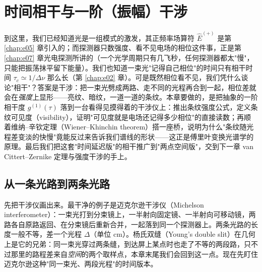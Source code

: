 \chapter{时间相干与一阶（振幅）干涉}
\label{chap:e09}

\begin{chapteropening}
到这里，我们已经知道光是一组模式的激发，其正频率场算符 \(\hat E^{(+)}\) 是第 \ref{chap:e05} 章引入的；而探测器只数强度、看不见电场的相位这件事，正是第 \ref{chap:e07} 章光电探测所讲的（一个光学周期只有几飞秒，任何探测器都太"慢"，只能把振荡抹平留下能量）。我们也知道一束光"记得自己相位"的时间只有相干时间 \(\tau_c\simeq1/\Delta\nu\) 那么长（第 \ref{chap:e02} 章）。可是既然相位看不见，我们凭什么谈论"相干"？答案是干涉：把一束光劈成两路、走不同的光程再合到一起，相位差就会在\emph{强度}上显形——亮纹、暗纹，一道一道的条纹。本章要做的，是把抽象的一阶相干度 \(g^{(1)}(\tau)\) 落到一台看得见摸得着的干涉仪上：推出条纹强度公式，定义条纹可见度（visibility），证明"可见度就是电场还记得多少相位"的直接读数；再顺着维纳--辛钦定理（Wiener--Khinchin theorem）搭一座桥，说明为什么"条纹随光程差变淡的快慢"竟能反过来告诉我们谱线的形状——这正是傅里叶变换光谱学的原理。最后我们把这套"时间延迟版"的相干推广到"两点空间版"，交到下一章 van Cittert--Zernike 定理与强度干涉的手上。
\end{chapteropening}

\section{从一条光路到两条光路}
\label{sec:e09-two-beams}

先把干涉仪画出来。最干净的例子是迈克尔逊干涉仪（Michelson interferometer）：一束光打到分束镜上，一半射向固定镜、一半射向可移动镜，两路各自原路返回、在分束镜后重新合并，一起落到同一个探测器上。两条光路的长度一般不等，差一个光程 \(\Delta\)（单位 cm）。杨氏双缝（Young's double slit）在几何上是它的兄弟：同一束光穿过两条缝，到达屏上某点时也走了不等的两段路，只不过那里的路程差来自\emph{空间}的两个取样点，本章末尾我们会回到这一点。现在先盯住迈克尔逊这种"同一束光、两段光程"的时间版本。

